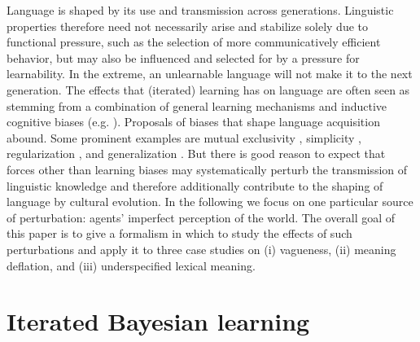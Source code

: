 \documentclass[10pt,a4paper]{article}
\begin{document}
Language is shaped by its use and transmission across generations. Linguistic properties
therefore need not necessarily arise and stabilize solely due to functional pressure, such as
the selection of more communicatively efficient behavior, but may also be influenced
and selected for by a pressure for learnability. In the extreme, an unlearnable language
will not make it to the next generation. The effects that (iterated) learning has on language
are often seen as stemming from a combination of general learning mechanisms and inductive
cognitive biases
(e.g. \citealt{griffiths+kalish:2007,kirby+etal:2014,tamariz+kirby:2016}). Proposals of biases
that shape language acquisition abound. Some prominent examples are mutual exclusivity
\citep{merriman+bowman:1989,clark:2009}, simplicity \citep{kirby+etal:2015}, regularization
\citep{hudson+etal:2005}, and generalization
\citep{smith:2011,oconnor:2015}.
But
there is good reason to expect that forces other than learning biases may systematically
perturb the transmission of linguistic knowledge and therefore additionally contribute to the shaping
of language by cultural evolution.  In the following we focus on one particular source of perturbation:
agents' imperfect perception of the world. The overall goal of this paper is to give a formalism in which to study the effects of such
perturbations and apply it to three case studies on (i) vagueness, (ii) meaning deflation, and
(iii) underspecified lexical meaning.

\section{Iterated Bayesian learning}
\end{document}
